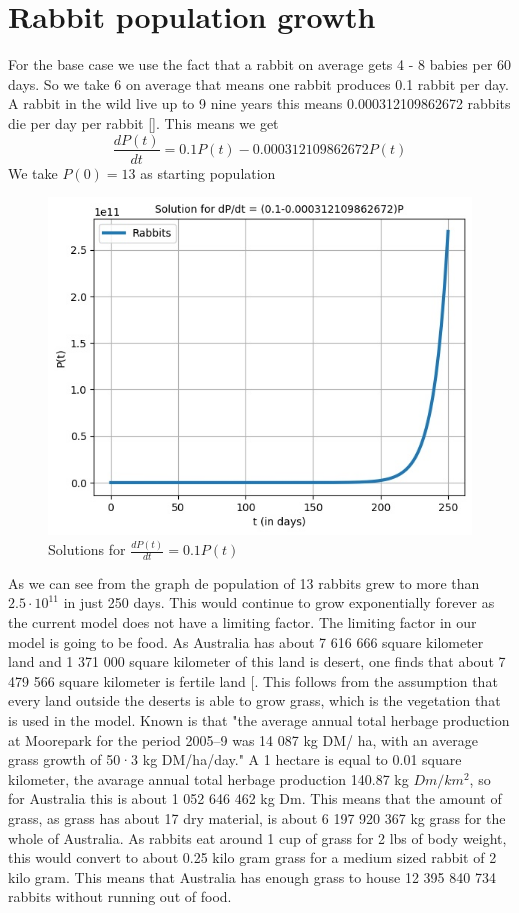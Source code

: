 \documentclass{article}
\begin{document}
\section{Rabbit population growth}
For the base case we use the fact that a rabbit on average gets 4 - 8 babies per 60 days. So we take 6 on average that means one rabbit produces 0.1 rabbit per day. A rabbit in the wild live up to 9 nine years this means 0.000312109862672 rabbits die per day per rabbit [\cite{RabbitsQ}]. This means we get 
$$
\frac{dP(t)}{dt} = 0.1P(t)-0.000312109862672P(t)
$$
We take $P(0) = 13$ as starting population
\begin{figure}[ht]
	\includegraphics[scale=0.6]{Pictures/unr_rabbitts}
	\caption{Solutions for $\frac{dP(t)}{dt} = 0.1P(t)$ }
	\label{fig:unr_rabbitts}
\end{figure}
\newpage
As we can see from the graph de population of 13 rabbits grew to more than  $2.5\cdot10^{11}$ in just 250 days. This would continue to grow exponentially forever as the current model does not have a limiting factor. The limiting factor in our model is going to be food. As Australia has about 7 616 666 square kilometer land and 1 371 000 square kilometer of this land is desert, one finds that about 7 479 566 square kilometer is fertile land  [\cite{FirtileLand}. This follows from the assumption that every land outside the deserts is able to grow grass, which is the vegetation that is used in the model. Known is that "the average annual total herbage production at Moorepark for the period 2005–9 was 14 087 kg DM/ ha, with an average grass growth of 50·3 kg DM/ha/day." A 1 hectare is equal to 0.01 square kilometer, the avarage annual total herbage production 140.87 kg $Dm/km^2$, so for Australia this is about 1 052 646 462 kg Dm. This means that the amount of grass, as grass has about 17 dry material, is about 6 197 920 367 kg grass for the whole of Australia. As rabbits eat around 1 cup of grass for 2 lbs of body weight, this would convert to about 0.25 kilo gram grass for a medium sized rabbit of 2 kilo gram. This means that Australia has enough grass to house 12 395 840 734 rabbits without running out of food.
\end{document}
